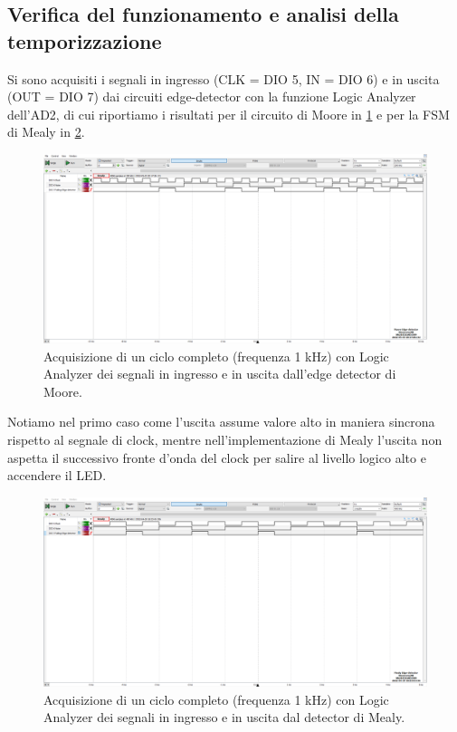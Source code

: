 \documentclass[10pt, a4paper, italian]{article}
\begin{document}
\subsection{Verifica del funzionamento e analisi della temporizzazione}
Si sono acquisiti i segnali in ingresso (CLK = DIO 5, IN = DIO 6) e in uscita
(OUT = DIO 7) dai circuiti edge-detector con la funzione Logic Analyzer
dell'AD2, di cui riportiamo i risultati per il circuito di Moore in
\cref{fig: edgeMoore} e per la FSM di Mealy in \cref{fig: edgeMealy}.
\begin{figure}[htbp]
    \centering
    \includegraphics[width=\textwidth]{Moore_edge_detector}
    \caption{Acquisizione di un ciclo completo (frequenza 1 kHz) con Logic
    Analyzer dei segnali in ingresso e in uscita dall'edge detector di Moore.
    \label{fig: edgeMoore}}
\end{figure}

Notiamo nel primo caso come l'uscita assume valore alto in maniera sincrona
rispetto al segnale di clock, mentre nell'implementazione di Mealy l'uscita
non aspetta il successivo fronte d'onda del clock per salire al livello logico
alto e accendere il LED.
\begin{figure}[htbp]
    \centering
    \includegraphics[width=\textwidth]{Mealy_edge_detector}
    \caption{Acquisizione di un ciclo completo (frequenza 1 kHz) con Logic
    Analyzer dei segnali in ingresso e in uscita dal detector di Mealy.
    \label{fig: edgeMealy}}
\end{figure}
\end{document}
